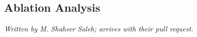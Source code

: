 \subsection{Ablation Analysis}
\label{sec:ablations}

\emph{Written by M. Shaheer Saleh; arrives with their pull request.}

